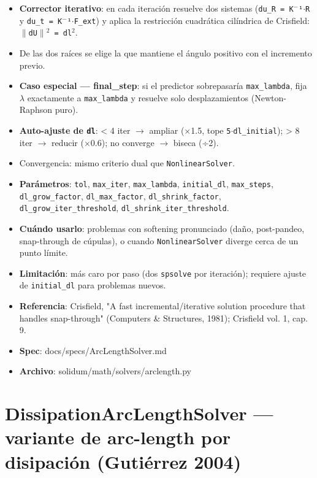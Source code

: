 \documentclass[11pt,letterpaper,oneside]{report}
\begin{document}
\begin{itemize}
  \item \textbf{Corrector iterativo}: en cada iteración resuelve dos sistemas (\texttt{du\_R = K\ensuremath{^{-}}¹\ensuremath{\cdot}R} y \texttt{du\_t = K\ensuremath{^{-}}¹\ensuremath{\cdot}F\_ext}) y aplica la restricción cuadrática cilíndrica de Crisfield: \texttt{\ensuremath{\|}dU\ensuremath{\|}\ensuremath{^{2}} = dl\ensuremath{^{2}}}.
  \item De las dos raíces se elige la que mantiene el ángulo positivo con el incremento previo.
  \item \textbf{Caso especial --- final\_step}: si el predictor sobrepasaría \texttt{max\_lambda}, fija \ensuremath{\lambda} exactamente a \texttt{max\_lambda} y resuelve solo desplazamientos (Newton-Raphson puro).
  \item \textbf{Auto-ajuste de \texttt{dl}}: < 4 iter \ensuremath{\to} ampliar (\ensuremath{\times}1.5, tope \texttt{5\ensuremath{\cdot}dl\_initial}); > 8 iter \ensuremath{\to} reducir (\ensuremath{\times}0.6); no converge \ensuremath{\to} biseca (÷2).
  \item Convergencia: mismo criterio dual que \texttt{NonlinearSolver}.
  \item \textbf{Parámetros}: \texttt{tol}, \texttt{max\_iter}, \texttt{max\_lambda}, \texttt{initial\_dl}, \texttt{max\_steps}, \texttt{dl\_grow\_factor}, \texttt{dl\_max\_factor}, \texttt{dl\_shrink\_factor}, \texttt{dl\_grow\_iter\_threshold}, \texttt{dl\_shrink\_iter\_threshold}.
  \item \textbf{Cuándo usarlo}: problemas con softening pronunciado (daño, post-pandeo, snap-through de cúpulas), o cuando \texttt{NonlinearSolver} diverge cerca de un punto límite.
  \item \textbf{Limitación}: más caro por paso (dos \texttt{spsolve} por iteración); requiere ajuste de \texttt{initial\_dl} para problemas nuevos.
  \item \textbf{Referencia}: Crisfield, "A fast incremental/iterative solution procedure that handles snap-through" (Computers \& Structures, 1981); Crisfield vol. 1, cap. 9.
  \item \textbf{Spec}: docs/specs/ArcLengthSolver.md
  \item \textbf{Archivo}: solidum/math/solvers/arclength.py
\end{itemize}


\section{DissipationArcLengthSolver --- variante de arc-length por disipación (Gutiérrez 2004)}
\end{document}

